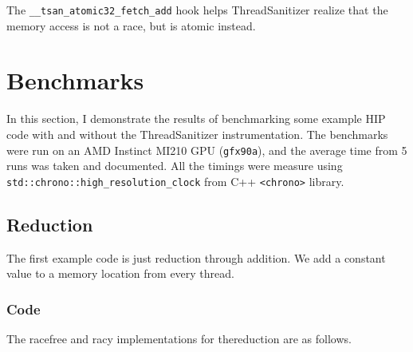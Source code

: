 \documentclass{btp}
\begin{document}
The \texttt{\_\_tsan\_atomic32\_fetch\_add} hook helps ThreadSanitizer realize that the memory access is not a race, but is atomic instead.

\section{Benchmarks}

In this section, I demonstrate the results of benchmarking some example HIP code with and without the ThreadSanitizer instrumentation. The benchmarks were run on an AMD Instinct MI210 GPU (\texttt{gfx90a}), and the average time from 5 runs was taken and documented. All the timings were measure using \texttt{std::chrono::high\_resolution\_clock} from C++ \texttt{<chrono>} library.

\subsection{Reduction}

The first example code is just reduction through addition. We add a constant value to a memory location from every thread.

\subsubsection{Code}

The racefree and racy implementations for thereduction are as follows.
\end{document}

